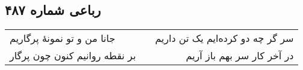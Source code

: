 \begin{center}
\section*{رباعی شماره ۴۸۷}
\label{sec:sh487}
\begin{longtable}{l p{0.5cm} r}
جانا من و تو نمونهٔ پرگاریم
&&
سر گر چه دو کرده‌ایم یک تن داریم
\\
بر نقطه روانیم کنون چون پرگار
&&
در آخر کار سر بهم باز آریم
\\
\end{longtable}
\end{center}
